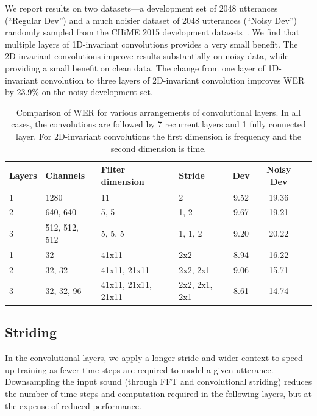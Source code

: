 We report results on two datasets---a development set of 2048 utterances
(``Regular Dev'') and a much noisier dataset of 2048 utterances (``Noisy Dev'')
randomly sampled from the CHiME 2015 development
datasets~\cite{barker2015chime}. We find that multiple layers of 1D-invariant
convolutions provides a very small benefit. The 2D-invariant convolutions
improve results substantially on noisy data, while providing a small benefit on
clean data. The change from one layer of 1D-invariant convolution to three
layers of 2D-invariant convolution improves WER by 23.9\% on the noisy
development set.

\begin{table}
\centering
\begin{tabular}{l l l l c c c}
\toprule
Layers & Channels & Filter dimension    & Stride       & Dev         & Noisy Dev \\
\midrule
1 & 1280          & 11                  & 2             & 9.52        & 19.36 \\
2 & 640, 640      & 5, 5                & 1, 2          & 9.67        & 19.21 \\
3 & 512, 512, 512 & 5, 5, 5             & 1, 1, 2       & 9.20        & 20.22 \\
1 & 32            & 41x11               & 2x2           & 8.94        & 16.22 \\
2 & 32, 32        & 41x11, 21x11        & 2x2, 2x1      & 9.06        & 15.71 \\
3 & 32, 32, 96    & 41x11, 21x11, 21x11 & 2x2, 2x1, 2x1 & 8.61        & 14.74 \\
\bottomrule
\end{tabular}
\caption{Comparison of WER for various arrangements of convolutional layers. In
         all cases, the convolutions are followed by 7 recurrent layers and 1 fully
         connected layer. For 2D-invariant convolutions the first dimension is
         frequency and the second dimension is time.}
\label{table:scaling_asr:2dconv}
\end{table}

\subsection{Striding}

In the convolutional layers, we apply a longer stride and wider context to
speed up training as fewer time-steps are required to model a given utterance.
Downsampling the input sound (through FFT and convolutional striding) reduces
the number of time-steps and computation required in the following layers, but
at the expense of reduced performance. 

